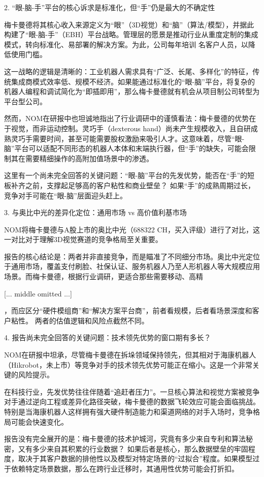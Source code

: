 \documentclass[11pt]{ctexart}
\begin{document}
2. “眼-脑-手”平台的核心诉求是标准化，但“手”仍是最大的不确定性

梅卡曼德将其核心收入来源定义为“眼”（3D视觉）和“脑”（算法/模型），并据此构建了“眼-脑-手”（EBH）平台战略。管理层的愿景是推动行业从重度定制的集成模式，转向标准化、易部署的解决方案。为此，公司每年培训 名客户人员，以降低使用门槛。

这一战略的逻辑是清晰的：工业机器人需求具有“广泛、长尾、多样化”的特征，传统集成商模式效率低、规模不经济。如果能通过标准化的“眼-脑”平台，将复杂的机器人编程和调试简化为“即插即用”，那么梅卡曼德就有机会从项目制公司转型为平台型公司。

然而，NOM在研报中也坦诚地指出了行业调研中的谨慎看法：梅卡曼德的优势在于视觉，而非运动控制。灵巧手（dexterous hand）尚未产生规模收入，且自研成熟灵巧手需要时间，甚至可能需要股权激励来吸引人才。这意味着，尽管“眼-脑”平台可以适配不同形态的机器人本体和末端执行器，但“手”的缺失，可能会限制其在需要精细操作的高附加值场景中的渗透。

这里有一个尚未完全回答的关键问题：“眼-脑”平台的先发优势，能否在“手”的短板补齐之前，支撑起足够高的客户粘性和商业壁垒？ 如果“手”的成熟周期过长，竞争对手可能在“眼-脑”层面迎头赶上。

3. 与奥比中光的差异化定位：通用市场 vs 高价值利基市场

NOM将梅卡曼德与A股上市的奥比中光（688322 CH，买入评级）进行了对比，这一对比对于理解3D视觉赛道的竞争格局至关重要。

报告的核心结论是：两者并非直接竞争，而是瞄准了不同细分市场。奥比中光定位于通用市场，覆盖支付刷脸、社保认证、服务机器人乃至人形机器人等大规模应用场景。而梅卡曼德，根据行业调研，更适合那些需要移动、高精

[... middle omitted ...]

，而应区分“硬件模组商”和“解决方案平台商”，前者看规模，后者看场景深度和客户粘性。 两者的估值逻辑和风险点截然不同。

4. 报告尚未完全回答的关键问题：技术领先优势的窗口期有多长？

NOM在研报中坦承，尽管梅卡曼德在拆垛领域保持领先，但其相对于海康机器人（Hikrobot，未上市）等竞争对手的技术领先优势可能正在缩小。这是一个非常关键的风险提示。

在科技行业，先发优势往往伴随着“追赶者压力”。一旦核心算法和视觉方案被竞争对手通过逆向工程或差异化路径突破，梅卡曼德的数据飞轮效应可能会面临挑战。特别是当海康机器人这样拥有强大硬件制造能力和渠道网络的对手入场时，竞争格局可能会快速变化。

报告没有完全展开的是：梅卡曼德的技术护城河，究竟有多少来自专利和算法秘密，又有多少来自其积累的行业数据？ 如果后者是核心，那么数据壁垒的牢固程度，取决于其客户数据的排他性以及模型对特定场景的“过拟合”程度。如果模型过于依赖特定场景数据，那么在跨行业迁移时，其通用性优势可能会打折扣。
\end{document}

